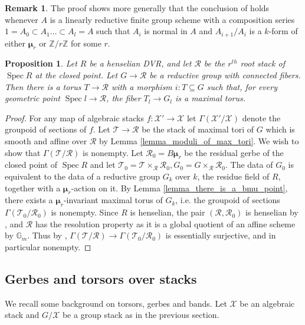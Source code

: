 \documentclass{amsart}
\newtheorem{proposition}[proposition]{Proposition}
\theoremstyle{definition}
\newtheorem{remark}[remark]{Remark}
\newcommand{\bG}{\mathbb{G}}
\newcommand{\bZ}{\mathbb{Z}}
\newcommand{\cX}{\mathcal{X}}
\newcommand{\cR}{\mathcal{R}}
\newcommand{\cT}{\mathcal{T}}
\newcommand{\bmu}{\pmb{\mu}}
\DeclareMathOperator{\Spec}{Spec}
\newcommand{\spec}{\operatorname{Spec}}
\begin{document}
\begin{remark}The proof shows more generally that the conclusion of \cite[Theorem $3''$]{serre2010bounds} holds whenever $A$ is a linearly reductive finite group scheme with a composition series $1 = A_0 \subset A_1 \ldots \subset A_l = A$ such that $A_i$ is normal in $A$ and $A_{i+1}/A_i$ is a $k$-form of either $\bmu_r$ or $\bZ/r\bZ$ for some $r$. \end{remark}


\begin{proposition}\label{prop_there_is_a_max_torus}
    Let $R$ be a henselian DVR, and let $\cR$ be the $r^{th}$ root stack of $\spec R$ at the closed point. Let $G\to \cR$ be a reductive group with connected fibers. Then there is a torus $T\to \cR$ with a morphism $i:T\subseteq G$ such that, for every geometric point $\spec l \to \cR$, the fiber $T_{l}\to G_{l}$ is a maximal torus.
\end{proposition}

\begin{proof} For any map of algebraic stacks $f : \cX' \to \cX$ let $\Gamma(\cX'/\cX)$ denote the groupoid of sections of $f$. Let $\cT \to \cR$ be the stack of maximal tori of $G$ which is smooth and affine over $\cR$ by Lemma \ref{lemma_moduli_of_max_tori}. We wish to show that $\Gamma(\cT/\cR)$ is nonempty. Let $\cR_0 = B\bmu_r$ be the residual gerbe of the closed point of $\Spec R$ and let $\cT_0 = \cT \times_{\cR} \cR_0, G_0 = G \times_{\cR} \cR_0$. The data of $G_0$ is equivalent to the data of a reductive group $G_{k}$ over $k$, the residue field of $R$, together with a $\bmu_r$-action on it. By Lemma \ref{lemma_there_is_a_bmu_point}, there exists a $\bmu_r$-invariant maximal torus of $G_k$, i.e. the groupoid of sections $\Gamma(\cT_0/\cR_0)$ is nonempty. Since $R$ is henselian, the pair $(\cR, \cR_0)$ is henselian by \cite[Theorem 3.6]{AHRetalelocal}, and $\cR$ has the resolution property as it is a global quotient of an affine scheme by $\bG_m$. Thus by \cite[Proposition 7.9]{AHRetalelocal}, $\Gamma(\cT/\cR) \to \Gamma(\cT_0/\cR_0)$ is essentially surjective, and in particular nonempty. 
\end{proof} 

\subsection{Gerbes and torsors over stacks} 



We recall some background on torsors, gerbes and bands. Let $\cX$ be an algebraic stack and $G/\cX$ be a group stack as in the previous section. 
\end{document}
